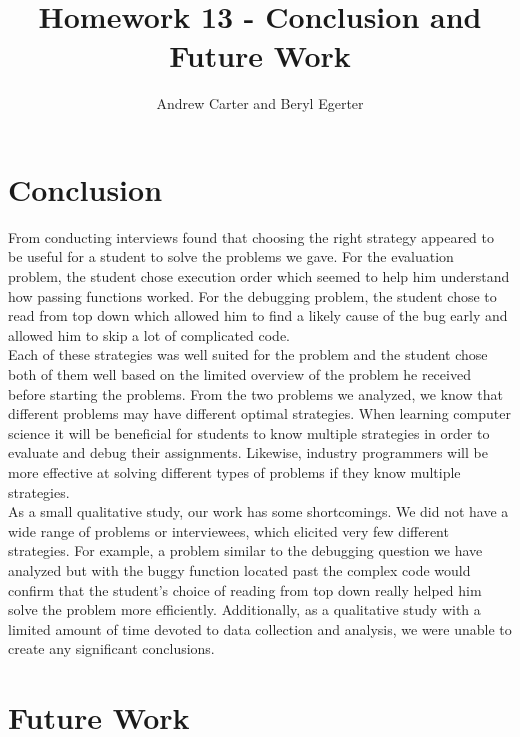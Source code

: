 \documentclass{article}
\title{Homework 13 - Conclusion and Future Work}
\author{Andrew Carter and Beryl Egerter}
\begin{document}
\maketitle
\section{Conclusion}

From conducting interviews found that choosing the right strategy appeared to be useful for a student to solve the problems we gave. 
For the evaluation problem, the student chose execution order which seemed to help him understand how passing functions worked. 
For the debugging problem, the student chose to read from top down which allowed him to find a likely cause of the bug early and allowed him to skip a lot of complicated code.  \\

Each of these strategies was well suited for the problem and the student chose both of them well based on the limited overview of the problem he received before starting the problems. 
From the two problems we analyzed, we know that different problems may have different optimal strategies.
When learning computer science it will be beneficial for students to know multiple strategies in order to evaluate and debug their assignments. Likewise, industry programmers will be more effective at solving different types of problems if they know multiple strategies. \\

As a small qualitative study, our work has some shortcomings. We did not have a wide range of problems or interviewees, which elicited very few different strategies. For example, a problem similar to the debugging question we have analyzed but with the buggy function located past the complex code would confirm that the student's choice of reading from top down really helped him solve the problem more efficiently. Additionally, as a qualitative study with a limited amount of time devoted to data collection and analysis, we were unable to create any significant conclusions. 

\section{Future Work}


\end{document}
